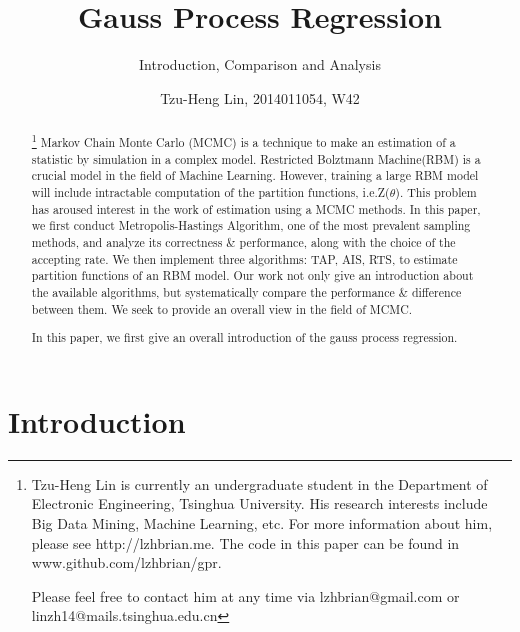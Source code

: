 \documentclass{sig-alternate-05-2015}
\begin{document}
\title{Gauss Process Regression}
\subtitle{Introduction, Comparison and Analysis}
\author{
    \alignauthor Tzu-Heng Lin, 2014011054, W42\\
}


\maketitle
\begin{abstract}
\footnote{Tzu-Heng Lin is currently an undergraduate student in the Department of Electronic Engineering, Tsinghua University. His research interests include Big Data Mining, Machine Learning, etc. For more information about him, please see http://lzhbrian.me. The code in this paper can be found in www.github.com/lzhbrian/gpr.

Please feel free to contact him at any time via lzhbrian@gmail.com or linzh14@mails.tsinghua.edu.cn}
Markov Chain Monte Carlo (MCMC) is a technique to make an estimation of a statistic by simulation in a complex model. Restricted Bolztmann Machine(RBM) is a crucial model in the field of Machine Learning. However, training a large RBM model will include intractable computation of the partition functions, i.e.Z($\theta$). This problem has aroused interest in the work of estimation using a MCMC methods.
In this paper, we first conduct Metropolis-Hastings Algorithm, one of the most prevalent sampling methods, and analyze its correctness \& performance, along with the choice of the accepting rate. We then implement three algorithms: TAP, AIS, RTS, to estimate partition functions of an RBM model. Our work not only give an introduction about the available algorithms, but systematically compare the performance \& difference between them. We seek to provide an overall view in the field of MCMC.

In this paper, we first give an overall introduction of the gauss process regression.


\end{abstract}




%
%
\printccsdesc



\section{Introduction} \label{sec:introduction}
\end{document}
